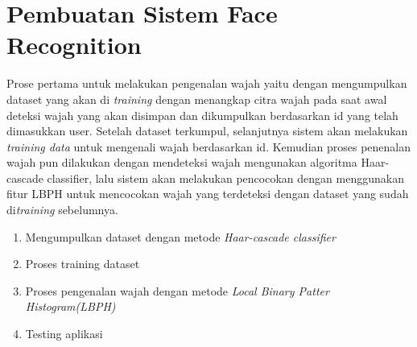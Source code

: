 \newpage
\section{Pembuatan Sistem Face Recognition}
Prose pertama untuk melakukan pengenalan wajah yaitu dengan mengumpulkan dataset yang akan di \emph{training} dengan menangkap citra wajah pada saat awal deteksi wajah yang akan disimpan dan dikumpulkan berdasarkan id yang telah dimasukkan user. Setelah dataset terkumpul, selanjutnya
sistem akan melakukan \emph{training data} untuk mengenali wajah berdasarkan id. Kemudian proses penenalan wajah pun dilakukan dengan mendeteksi wajah mengunakan algoritma Haar-cascade classifier, lalu sistem akan melakukan pencocokan dengan menggunakan fitur LBPH untuk mencocokan wajah yang terdeteksi dengan dataset yang sudah di\emph{training} sebelumnya.
\begin{enumerate}[- ]
\item Mengumpulkan dataset dengan metode \emph{Haar-cascade classifier}
\item Proses training dataset
\item Proses pengenalan wajah dengan metode \emph{Local Binary Patter Histogram(LBPH)}
\item Testing aplikasi
\end{enumerate}
